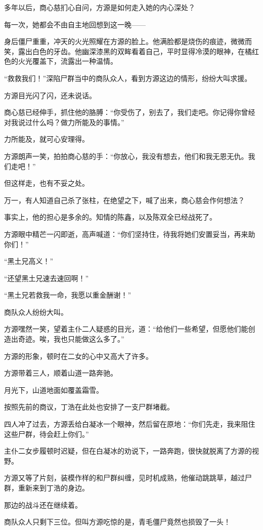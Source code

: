 \begin{this_body}
多年以后，商心慈扪心自问，方源是如何走入她的内心深处？

每一次，她都会不由自主地回想到这一晚——

身后僵尸重重，冲天的火光照耀在方源的脸上。他满脸都是烧伤的痕迹，微微而笑，露出白色的牙齿。他幽深漆黑的双眸看着自己，平时显得冷漠的眼神，在橘红色的火光覆盖下，流露出一种温情。

“救救我们！”深陷尸群当中的商队众人，看到方源这边的情形，纷纷大叫求援。

方源目光闪了闪，还未说话。

商心慈已经伸手，抓住他的胳膊：“你受伤了，别去了，我们走吧。你记得你曾经对我说过什么吗？做力所能及的事情。”

力所能及，就可心安理得。

方源朗声一笑，拍拍商心慈的手：“你放心，我没有想去，他们和我无恩无仇。我们走吧！”

但这样走，也有不妥之处。

万一，有人知道自己杀了张柱，在绝望之下，喊了出来，商心慈会作何想法？

事实上，他的担心是多余的。知情的陈鑫，以及陈双全已经战死了。

方源眼中精芒一闪即逝，高声喊道：“你们坚持住，待我将她们安置妥当，再来助你们！”

“黑土兄高义！”

“还望黑土兄速去速回啊！”

“黑土兄若救我一命，我愿以重金酬谢！”

商队众人纷纷大叫。

方源嘿然一笑，望着主仆二人疑惑的目光，道：“给他们一些希望，但愿他们能创造出奇迹。唉，我也只能做这么多了。”

方源的形象，顿时在二女的心中又高大了许多。

方源带着三人，顺着山道一路奔驰。

月光下，山道地面如覆盖霜雪。

按照先前的商议，丁浩在此处也安排了一支尸群堵截。

四人冲了过去，方源丢给白凝冰一个眼神，然后留在原地：“你们先走，我来阻住这些尸群，待会赶上你们。”

主仆二女步履顿时迟疑，但在白凝冰的劝说下，一路奔跑，很快就脱离了方源的视野。

方源又等了片刻，装模作样的和尸群纠缠，见时机成熟，他催动跳跳草，越过尸群，重新来到丁浩的身边。

那边的战斗还在继续着。

商队众人只剩下三位。但叫方源吃惊的是，青毛僵尸竟然也损毁了一头！


\end{this_body}
